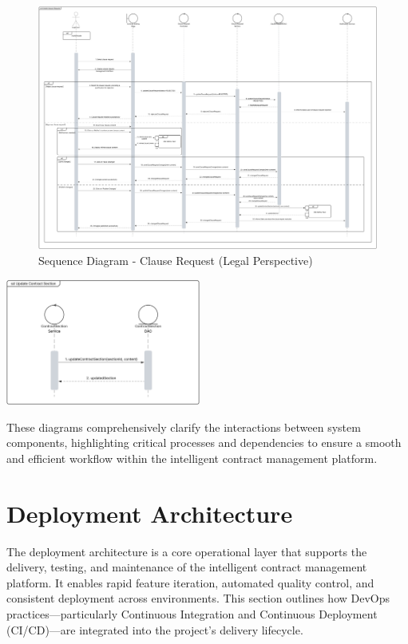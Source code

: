 \begin{landscape}
\begin{figure}[H]
    \centering
    \includegraphics[width=1.3\textwidth]{Images/Sequence Diagram - Legal - Clause Request.png}
    \caption{Sequence Diagram - Clause Request (Legal Perspective)}
    \label{fig:sequence_diagram_clause_request_legal}
\end{figure}
\end{landscape}

\begin{center}
    \centering
    \includegraphics[width=0.48\textwidth]{Images/Sequence Diagram - Update Sections Ref.png}
    \label{fig:sequence_diagram_update_contract_sections}
\end{center}

These diagrams comprehensively clarify the interactions between system components, highlighting critical processes and dependencies to ensure a smooth and efficient workflow within the intelligent contract management platform.

\section{Deployment Architecture}
The deployment architecture is a core operational layer that supports the delivery, testing, and maintenance of the intelligent contract management platform. It enables rapid feature iteration, automated quality control, and consistent deployment across environments. This section outlines how DevOps practices—particularly Continuous Integration and Continuous Deployment (CI/CD)—are integrated into the project’s delivery lifecycle.

